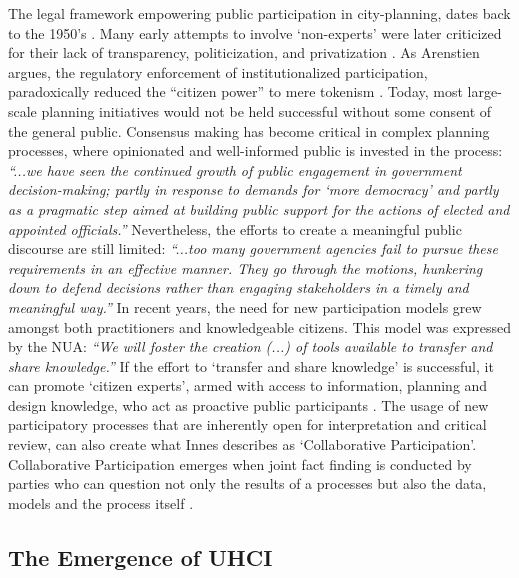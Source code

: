{
    The legal framework empowering public participation in city-planning, dates back to the 1950's \cite{banerjee2011companion}. Many early attempts to involve `non-experts' were later criticized for their lack of transparency, politicization, and privatization \cite{Innes2016}. As Arenstien argues, the regulatory enforcement of institutionalized participation, paradoxically reduced the ``citizen power'' to mere tokenism \cite{arnstein1969ladder}. Today, most large-scale planning initiatives would not be held successful without some consent of the general public. Consensus making has become critical in complex planning processes, where opinionated and well-informed public is invested in the process: \textit{``...we have seen the continued growth of public engagement in government decision-making; partly in response to demands for `more democracy' and partly as a pragmatic step aimed at building public support for the actions of elected and appointed officials.''} \cite{susskind1984mediated} Nevertheless, the efforts to create a meaningful public discourse are still limited: \textit{``...too many government agencies fail to pursue these requirements in an effective manner. They go through the motions, hunkering down to defend decisions rather than engaging stakeholders in a timely and meaningful way.''} \cite{susskind1984mediated}
    \newline
    In recent years, the need for new participation models grew amongst both practitioners and knowledgeable citizens. This model was expressed by the NUA: \textit{``We will foster the creation (...) of tools available to transfer and share knowledge.''} \cite{habitat2016new}
    If the effort to `transfer and share knowledge' is successful, it can promote `citizen experts', armed with access to information, planning and design knowledge, who act as proactive public participants \cite{banerjee2011companion}. The usage of new participatory processes that are inherently open for interpretation and critical review, can also create what Innes describes as `Collaborative Participation'. Collaborative Participation emerges when joint fact finding is conducted by parties who can question not only the results of a processes but also the data, models and the process itself \cite{Innes2016}.
}

\subsection{The Emergence of UHCI}\label{subsec:emergence_uhci}


